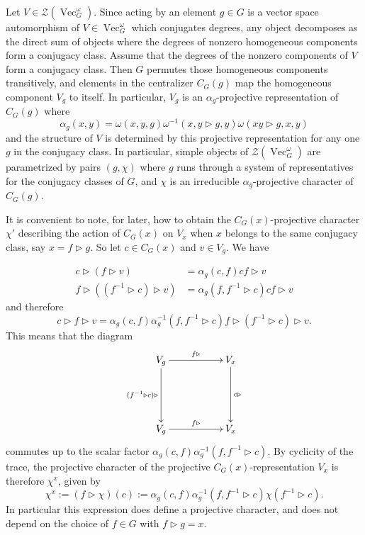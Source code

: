 \documentclass[11pt]{book}
\theoremstyle{Rem}
\theoremstyle{definition}
\numberwithin{equation}{section}
\newcommand\hit{\triangleright}
\newcommand\inv{^{-1}}
\newcommand\Vect{\operatorname{Vec}}
\newcommand\CTR{\mathcal Z}
\begin{document}
Let $V\in\CTR(\Vect_G^\omega)$. Since acting by an element $g\in G$ is a vector space automorphism of $V\in\Vect_G^\omega$ which conjugates degrees, any object decomposes as the direct sum of objects where the degrees of nonzero homogeneous components form a conjugacy class. Assume that the degrees of the nonzero components of $V$ form a conjugacy class. Then $G$ permutes those homogeneous components transitively, and elements in the centralizer $C_G(g)$ map the homogeneous component $V_g$ to itself. In particular, $V_g$ is an $\alpha_g$-projective representation of $C_G(g)$ where
\begin{equation}\label{alpha}
\alpha_g(x,y)=\omega(x,y,g)\omega^{-1}(x,y \hit g,y)\omega(xy \hit g ,x ,y)
\end{equation}
and the structure of $V$ is determined by this projective representation for any one $g$ in the conjugacy class. In particular, simple objects of $\CTR(\Vect_G^\omega)$ are parametrized by pairs $(g,\chi)$ where $g$ runs through a system of representatives for the conjugacy classes of $G$, and $\chi$ is an irreducible $\alpha_g$-projective character of $C_G(g)$.

It is convenient to note, for later, how to obtain the $C_G(x)$-projective character $\chi'$ describing the action of $C_G(x)$ on $V_x$ when $x$ belongs to the same conjugacy class, say $x=f\hit g$. So let $c\in C_G(x)$ and $v\in V_g$. We have

\begin{align}\label{1}
c \hit (f \hit v) &= \alpha_{g}(c, f) cf \hit v\\
f \hit ((f\inv\hit c) \hit v)   &= \alpha_{g}(f, f^{-1}\hit c) cf \hit v
\end{align}
and therefore
\begin{equation*}
  c\hit f\hit v  = \alpha_{g}(c, f) \alpha_{g}\inv(f, f^{-1}\hit c) f \hit (f\inv\hit c)\hit v .
\end{equation*}
This means that the diagram
\begin{equation*}
\xymatrix {V_g \ar[rr]^{f\hit} \ar[dd]_{(f^{-1} \hit c)\hit}   & & V_x \ar[dd]^{c\hit}\\
\\
 V_g \ar[rr]^{f\hit}  & & V_x}
\end{equation*}
commutes up to the scalar factor $\alpha_{g}(c, f) \alpha_{g}\inv(f, f^{-1}\hit c)$. By cyclicity of the trace, the projective character of the projective $C_G(x)$-representation $V_x$ is therefore $\chi^x$, given by
\begin{equation}\label{chi}
  \chi^x:=(f\hit\chi)(c):=\alpha_{g}(c, f) \alpha_{g}\inv(f, f^{-1}\hit c)\chi(f\inv\hit c).
\end{equation}
In particular this expression does define a projective character, and does not depend on the choice of $f\in G$ with $f\hit g=x$.
\end{document}

